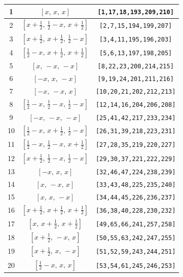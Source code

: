 \documentclass[fleqn,8pt]{jsarticle}
\begin{document}
\begin{longtable}{ccc}
1 & $\left[ x,\, x,\, x \right]$ & {\tt [1,17,18,193,209,210]} \\ \hline
2 & $\left[ x + \frac{1}{2},\, \frac{1}{2} - x,\, x + \frac{1}{2} \right]$ & {\tt [2,7,15,194,199,207]} \\ \hline
3 & $\left[ x + \frac{1}{2},\, x + \frac{1}{2},\, \frac{1}{2} - x \right]$ & {\tt [3,4,11,195,196,203]} \\ \hline
4 & $\left[ \frac{1}{2} - x,\, x + \frac{1}{2},\, x + \frac{1}{2} \right]$ & {\tt [5,6,13,197,198,205]} \\ \hline
5 & $\left[ x,\, - x,\, - x \right]$ & {\tt [8,22,23,200,214,215]} \\ \hline
6 & $\left[ - x,\, x,\, - x \right]$ & {\tt [9,19,24,201,211,216]} \\ \hline
7 & $\left[ - x,\, - x,\, x \right]$ & {\tt [10,20,21,202,212,213]} \\ \hline
8 & $\left[ \frac{1}{2} - x,\, \frac{1}{2} - x,\, \frac{1}{2} - x \right]$ & {\tt [12,14,16,204,206,208]} \\ \hline
9 & $\left[ - x,\, - x,\, - x \right]$ & {\tt [25,41,42,217,233,234]} \\ \hline
10 & $\left[ \frac{1}{2} - x,\, x + \frac{1}{2},\, \frac{1}{2} - x \right]$ & {\tt [26,31,39,218,223,231]} \\ \hline
11 & $\left[ \frac{1}{2} - x,\, \frac{1}{2} - x,\, x + \frac{1}{2} \right]$ & {\tt [27,28,35,219,220,227]} \\ \hline
12 & $\left[ x + \frac{1}{2},\, \frac{1}{2} - x,\, \frac{1}{2} - x \right]$ & {\tt [29,30,37,221,222,229]} \\ \hline
13 & $\left[ - x,\, x,\, x \right]$ & {\tt [32,46,47,224,238,239]} \\ \hline
14 & $\left[ x,\, - x,\, x \right]$ & {\tt [33,43,48,225,235,240]} \\ \hline
15 & $\left[ x,\, x,\, - x \right]$ & {\tt [34,44,45,226,236,237]} \\ \hline
16 & $\left[ x + \frac{1}{2},\, x + \frac{1}{2},\, x + \frac{1}{2} \right]$ & {\tt [36,38,40,228,230,232]} \\ \hline
17 & $\left[ x,\, x + \frac{1}{2},\, x + \frac{1}{2} \right]$ & {\tt [49,65,66,241,257,258]} \\ \hline
18 & $\left[ x + \frac{1}{2},\, - x,\, x \right]$ & {\tt [50,55,63,242,247,255]} \\ \hline
19 & $\left[ x + \frac{1}{2},\, x,\, - x \right]$ & {\tt [51,52,59,243,244,251]} \\ \hline
20 & $\left[ \frac{1}{2} - x,\, x,\, x \right]$ & {\tt [53,54,61,245,246,253]} \\ \hline

\end{longtable}
\end{document}

